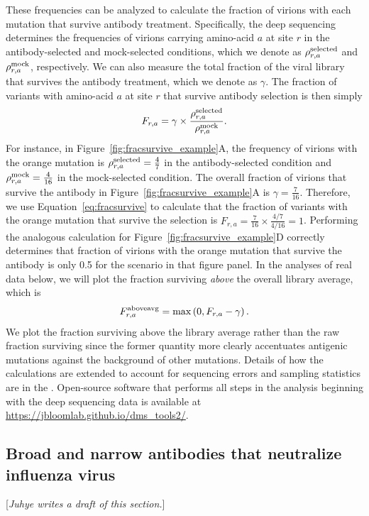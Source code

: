 \documentclass[11pt]{article}
\newcommand{\comment}[1]{{\color{red}[\textsl{#1}]}}
\begin{document}
These frequencies can be analyzed to calculate the fraction of virions with each mutation that survive antibody treatment.
Specifically, the deep sequencing determines the frequencies of virions carrying amino-acid $a$ at site $r$ in the antibody-selected and mock-selected conditions, which we denote as $\rho_{r,a}^{\rm{selected}}$ and $\rho_{r,a}^{\rm{mock}}$, respectively.
We can also measure the total fraction of the viral library that survives the antibody treatment, which we denote as $\gamma$.
The fraction of variants with amino-acid $a$ at site $r$ that survive antibody selection is then simply 
\begin{equation}
\label{eq:fracsurvive}
F_{r,a} = \gamma \times \frac{\rho_{r,a}^{\rm{selected}}}{\rho_{r,a}^{\rm{mock}}}.
\end{equation}
For instance, in Figure~\ref{fig:fracsurvive_example}A, the frequency of virions with the orange mutation is $\rho_{r,a}^{\rm{selected}} = \frac{4}{7}$ in the antibody-selected condition and $\rho_{r,a}^{\rm{mock}} = \frac{4}{16}$ in the mock-selected condition.
The overall fraction of virions that survive the antibody in Figure~\ref{fig:fracsurvive_example}A is $\gamma = \frac{7}{16}$.
Therefore, we use Equation~\ref{eq:fracsurvive} to calculate that the fraction of variants with the orange mutation that survive the selection is $F_{r,a} = \frac{7}{16} \times \frac{4/7}{4/16} = 1$.
Performing the analogous calculation for Figure~\ref{fig:fracsurvive_example}D correctly determines that fraction of virions with the orange mutation that survive the antibody is only 0.5 for the scenario in that figure panel.
In the analyses of real data below, we will plot the fraction surviving \emph{above} the overall library average, which is
\begin{equation}
\label{eq:fracsurvive_above}
F_{r,a}^{\rm{aboveavg}} = \max\left(0, F_{r,a} - \gamma\right).
\end{equation}
We plot the fraction surviving above the library average rather than the raw fraction surviving since the former quantity more clearly accentuates antigenic mutations against the background of other mutations.
Details of how the calculations are extended to account for sequencing errors and sampling statistics are in the .
Open-source software that performs all steps in the analysis beginning with the deep sequencing data is available at \url{https://jbloomlab.github.io/dms_tools2/}.

\subsection*{Broad and narrow antibodies that neutralize influenza virus}
\comment{Juhye writes a draft of this section.}
\end{document}
